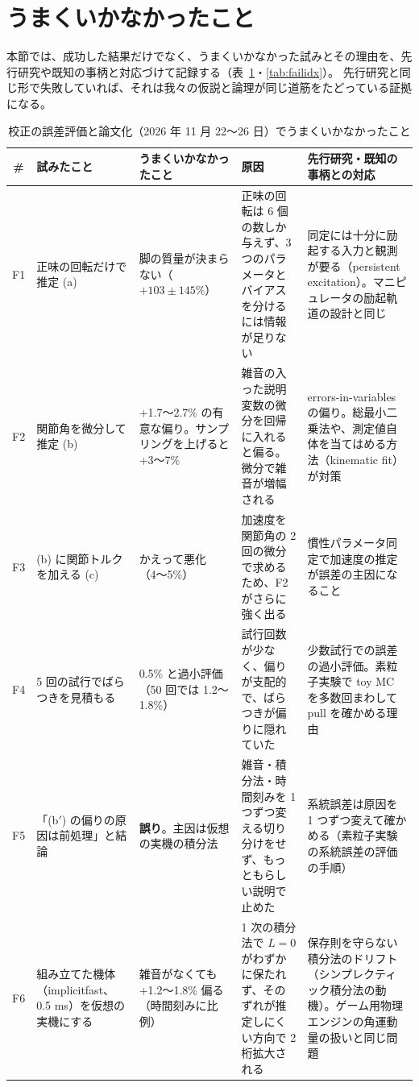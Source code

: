 \documentclass[paper=a4paper,fontsize=10pt,twocolumn,column_gap=2zw,line_length=24zw,number_of_lines=46,head_space=20mm]{jlreq}
\begin{document}
\section{うまくいかなかったこと}

本節では、成功した結果だけでなく、うまくいかなかった試みとその理由を、先行研究や既知の事柄と対応づけて記録する（表~\ref{tab:fail}・\ref{tab:failidx}）。
先行研究と同じ形で失敗していれば、それは我々の仮説と論理が同じ道筋をたどっている証拠になる。

\begin{table}[t]\centering\footnotesize
\caption{校正の誤差評価と論文化（2026 年 11 月 22〜26 日）でうまくいかなかったこと}\label{tab:fail}
\setlength{\tabcolsep}{3pt}
\begin{tabular}{cp{}p{}p{}p{}}\toprule
\# & 試みたこと & うまくいかなかったこと & 原因 & 先行研究・既知の事柄との対応 \\\midrule
F1 & 正味の回転だけで推定 (a) & 脚の質量が決まらない（$+103\pm145\%$） & 正味の回転は 6 個の数しか与えず、3 つのパラメータとバイアスを分けるには情報が足りない & 同定には十分に励起する入力と観測が要る（persistent excitation）。マニピュレータの励起軌道の設計と同じ \\
F2 & 関節角を微分して推定 (b) & +1.7〜2.7\% の有意な偏り。サンプリングを上げると +3〜7\% & 雑音の入った説明変数の微分を回帰に入れると偏る。微分で雑音が増幅される & errors-in-variables の偏り。総最小二乗法や、測定値自体を当てはめる方法（kinematic fit）が対策 \\
F3 & (b) に関節トルクを加える (c) & かえって悪化（4〜5\%） & 加速度を関節角の 2 回の微分で求めるため、F2 がさらに強く出る & 慣性パラメータ同定で加速度の推定が誤差の主因になること \cite{atkeson1986} \\
F4 & 5 回の試行でばらつきを見積もる & 0.5\% と過小評価（50 回では 1.2〜1.8\%） & 試行回数が少なく、偏りが支配的で、ばらつきが偏りに隠れていた & 少数試行での誤差の過小評価。素粒子実験で toy MC を多数回まわして pull を確かめる理由 \\
F5 & 「(b$'$) の偏りの原因は前処理」と結論 & \textbf{誤り}。主因は仮想の実機の積分法 & 雑音・積分法・時間刻みを 1 つずつ変える切り分けをせず、もっともらしい説明で止めた & 系統誤差は原因を 1 つずつ変えて確かめる（素粒子実験の系統誤差の評価の手順） \\
F6 & 組み立てた機体（implicitfast、0.5 ms）を仮想の実機にする & 雑音がなくても +1.2〜1.8\% 偏る（時間刻みに比例） & 1 次の積分法で $L=0$ がわずかに保たれず、そのずれが推定しにくい方向で 2 桁拡大される & 保存則を守らない積分法のドリフト（シンプレクティック積分法の動機）。ゲーム用物理エンジンの角運動量の扱いと同じ問題 \\

\end{tabular}
\end{table}
\end{document}
